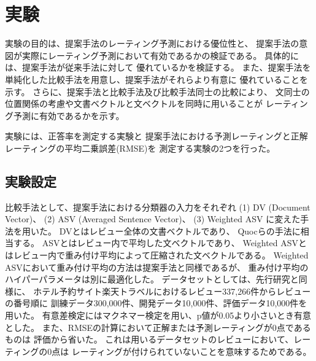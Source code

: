 \section{実験} \label{sec:Experiments}

実験の目的は、提案手法のレーティング予測における優位性と、
提案手法の意図が実際にレーティング予測において有効であるかの検証である。
具体的には、提案手法が従来手法\cite{fujitani15}に対して
優れているかを検証する。
また、提案手法を単純化した比較手法を用意し、提案手法がそれらより有意に
優れていることを示す。
さらに、提案手法と比較手法及び比較手法同士の比較により、
文同士の位置関係の考慮や文書ベクトルと文ベクトルを同時に用いることが
レーティング予測に有効であるかを示す。

実験には、正答率を測定する実験と
提案手法における予測レーティングと正解レーティングの平均二乗誤差(RMSE)を
測定する実験の2つを行った。


\subsection{実験設定}

比較手法として、提案手法における分類器の入力をそれぞれ
(1) DV (Document Vector)、
(2) ASV (Averaged Sentence Vector)、
(3) Weighted ASV
に変えた手法を用いた。
DVとはレビュー全体の文書ベクトルであり、
Quocら\cite{quoc14}の手法に相当する。
ASVとはレビュー内で平均した文ベクトルであり、
Weighted ASVとはレビュー内で重み付け平均によって圧縮された文ベクトルである。
Weighted ASVにおいて重み付け平均の方法は提案手法と同様であるが、
重み付け平均のハイパーパラメータは別に最適化した。
データセットとしては、先行研究\cite{fujitani15}と同様に、
ホテル予約サイト楽天トラベルにおけるレビュー337,266件からレビューの番号順に
訓練データ300,000件、開発データ10,000件、評価データ10,000件を用いた。
有意差検定にはマクネマー検定を用い、p値が0.05より小さいとき有意とした。
また、RMSEの計算において正解または予測レーティングが0点であるものは
評価から省いた。
これは用いるデータセットのレビューにおいて、レーティングの0点は
レーティングが付けられていないことを意味するためである。


